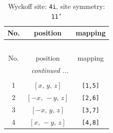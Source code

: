 \documentclass[fleqn,8pt]{jsarticle}
\begin{document}
\renewcommand{\arraystretch}{1.2}
\begin{longtable}{ccc}
\caption{Wyckoff site: {\tt 4i}, site symmetry: {\tt 11'}}
 \\
 \hline \hline
No. & position & mapping \\ \hline \endfirsthead

\multicolumn{2}{l}{\tablename\ \thetable{}} \\
 \hline \hline
No. & position & mapping \\ \hline \endhead

 \hline \hline
\multicolumn{2}{r}{\footnotesize\it continued ...} \\ \endfoot

 \hline \hline
\multicolumn{2}{r}{} \\ \endlastfoot

1 & $\left[ x,\, y,\, z \right]$ & {\tt [1,5]} \\ \hline
2 & $\left[ - x,\, - y,\, z \right]$ & {\tt [2,6]} \\ \hline
3 & $\left[ - x,\, y,\, z \right]$ & {\tt [3,7]} \\ \hline
4 & $\left[ x,\, - y,\, z \right]$ & {\tt [4,8]} \\
\end{longtable}
\end{document}
